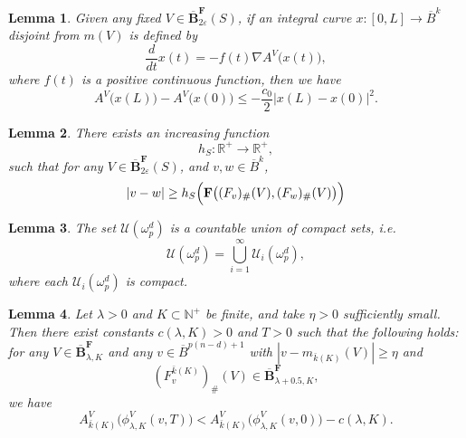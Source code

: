 \documentclass[10pt,a4paper]{amsart}
\newtheorem{lemma}{Lemma}
\begin{document}
\begin{lemma}
\label{lem:grad}
    Given any fixed $V \in \mathbf{\overline{B}}^{\textbf{F}}_{2\varepsilon}(S)$, if an integral curve $x: [0, L] \rightarrow \overline{B}^k$ disjoint from $m(V)$ is defined by
    \begin{equation*}
        \frac{d}{dt} x(t) = - f(t) \nabla A^V\bigl(x(t)\bigr),
    \end{equation*}
    where $f(t)$ is a positive continuous function, then we have
    \begin{equation*}
        A^V\bigl(x(L)\bigr) - A^V\bigl(x(0)\bigr) \leq - \frac{c_0}{2} |x(L) - x(0)|^2.
    \end{equation*}
\end{lemma}

\begin{lemma} \label{lem:dist_F}
    There exists an increasing function
    \begin{equation*}
        h_S : \mathbb{R}^+ \rightarrow \mathbb{R}^+,
    \end{equation*}
    such that for any $V \in \overline{\mathbf{B}}^{\mathbf{F}}_{2\varepsilon}(S)$, and $v, w \in \overline{B}^k$,
    \begin{equation*}
        |v - w| \geq h_S \Bigl(\mathbf{F}\bigl((F_v)_\#(V), (F_w)_\#(V)\bigr)\Bigr)
    \end{equation*}
\end{lemma}

\begin{lemma}\label{lem:union_compact}
    The set \(\mathcal{U}(\omega^d_p)\) is a countable union of compact sets, i.e.
    \[
        \mathcal{U}(\omega^d_p)=\bigcup_{i=1}^\infty\mathcal{U}_i(\omega^d_p),
    \]
    where each \(\mathcal{U}_i(\omega^d_p)\) is compact.
\end{lemma}

\begin{lemma}\label{lem:gradflow}
Let \(\lambda>0\) and \(K\subset\mathbb N^+\) be finite, and take \(\eta>0\) sufficiently small. Then there exist constants \(c(\lambda,K)>0\) and \(T>0\) such that the following holds: for any \(V\in\overline{\mathbf{B}}^{\mathbf F}_{\lambda,K}\) and any \(v\in\overline{B}^{p(n-d)+1}\) with \(|v-m_{\bar{k}(K)}(V)|\ge \eta\) and
\[
(F_v^{\bar{k}(K)})_\#(V)\in \overline{\mathbf{B}}^{\mathbf F}_{\lambda+0.5,K},
\]
we have
\[
A^V_{\bar{k}(K)}\bigl(\phi^V_{\lambda,K}(v,T)\bigr)
<
A^V_{\bar{k}(K)}\bigl(\phi^V_{\lambda,K}(v,0)\bigr)-c(\lambda,K).
\]
\end{lemma}
\end{document}
